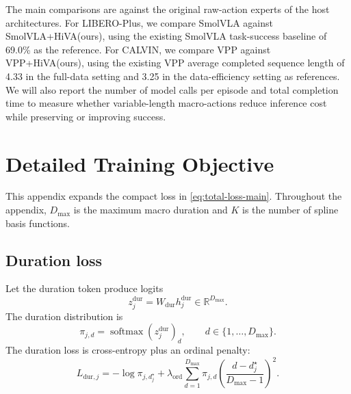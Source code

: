 \documentclass[10pt,twocolumn,letterpaper]{article}
\begin{document}
The main comparisons are against the original raw-action experts of the host architectures. For LIBERO-Plus, we compare SmolVLA against SmolVLA+HiVA(ours), using the existing SmolVLA task-success baseline of 69.0\% as the reference. For CALVIN, we compare VPP against VPP+HiVA(ours), using the existing VPP average completed sequence length of 4.33 in the full-data setting and 3.25 in the data-efficiency setting as references. We will also report the number of model calls per episode and total completion time to measure whether variable-length macro-actions reduce inference cost while preserving or improving success.

\appendix

\section{Detailed Training Objective}
\label{app:training-objective}
This appendix expands the compact loss in \cref{eq:total-loss-main}. Throughout the appendix, $D_{\max}$ is the maximum macro duration and $K$ is the number of spline basis functions.

\subsection{Duration loss}
Let the duration token produce logits
\begin{equation}
z_j^{\mathrm{dur}} = W_{\mathrm{dur}} h_j^{\mathrm{dur}} \in \mathbb{R}^{D_{\max}}.
\end{equation}
The duration distribution is
\begin{equation}
\pi_{j,d}=\operatorname{softmax}(z_j^{\mathrm{dur}})_d,
\qquad d\in\{1,\dots,D_{\max}\}.
\end{equation}
The duration loss is cross-entropy plus an ordinal penalty:
\begin{equation}
L_{\mathrm{dur},j} = -\log\pi_{j,d_j^{\star}} + \lambda_{\mathrm{ord}}
\sum_{d=1}^{D_{\max}} \pi_{j,d}
\left(\frac{d-d_j^{\star}}{D_{\max}-1}\right)^2.
\end{equation}
\end{document}
